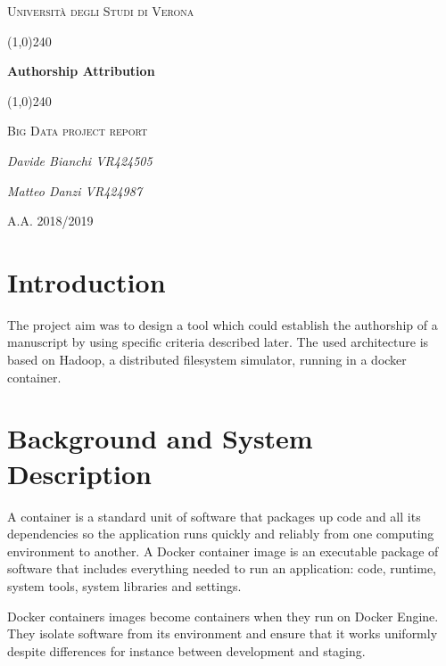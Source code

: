 \documentclass[a4paper, 11pt]{article}
\begin{document}
	\clearpage
	\begin{titlepage}
		\centering
		\vspace*{\fill}
		{\scshape\LARGE Università degli Studi di Verona \par}
		\vspace{1.5cm}
		\line(1,0){240} \\
		{\huge\bfseries Authorship Attribution\par}
		\line(1,0){240} \\
		\vspace{0.5cm}
		{\scshape\Large Big Data project report\par}
		\vspace{2cm}
		{\Large\itshape Davide Bianchi VR424505\par
		\Large\itshape Matteo Danzi VR424987\par}
		\vspace{1cm}
		\vspace{5cm}
		\vspace*{\fill}
		{\large A.A. 2018/2019\par}
	\end{titlepage}
	\thispagestyle{empty}
	\newpage
	\tableofcontents
	\newpage
	
	\section{Introduction}
	The project aim was to design a tool which could establish the authorship of a manuscript by using specific criteria described later. 
	The used architecture is based on Hadoop, a distributed filesystem simulator, running in a docker container. 

	\section{Background and System Description}

	\noindent
	A container is a standard unit of software that packages up code and all its dependencies so the application runs quickly and reliably from one computing environment to another. A Docker container image is an executable package of software that includes everything needed to run an application: code, runtime, system tools, system libraries and settings.

	\bigskip

	\noindent
	Docker containers images become containers when they run on Docker Engine. They isolate software from its environment and ensure that it works uniformly despite differences for instance between development and staging.
	
\end{document}
